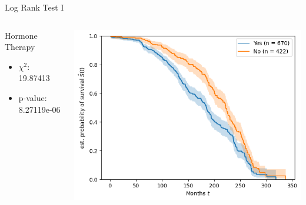 \documentclass{beamer}
\begin{document}
\begin{frame}{Log Rank Test I}
    \begin{columns}
        \begin{column}{0.49 \textwidth}
        Hormone Therapy
        \begin{itemize}
            \item $\chi^2$: 19.87413
            \item p-value: 8.27119e-06
        \end{itemize}
        \end{column}
        \begin{column}{0.49 \textwidth}
            \centering
            \includegraphics[width = \textwidth]{images/logrank1}
        \end{column}
    \end{columns}
\end{frame}
\end{document}
